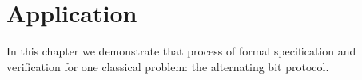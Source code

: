 \section{Application}
\label{sec:application}
In this chapter we demonstrate that process of formal specification and verification for 
one classical problem: the alternating bit protocol.


%